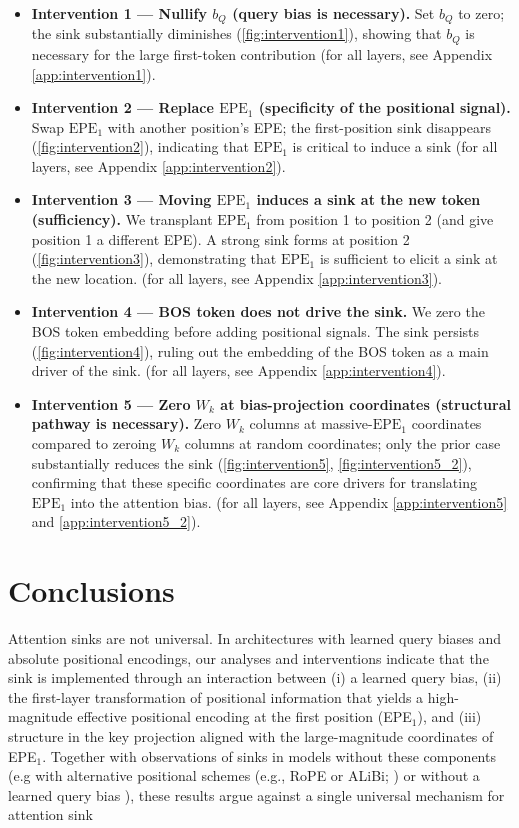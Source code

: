 \documentclass[11pt]{article}
\newif\ifYRMcomments
\newcommand{\YRM}[1]{\ifYRMcomments\textcolor{red}{[YRM: #1]}\fi}
\begin{document}
\begin{itemize}[leftmargin=*]
  \item \textbf{Intervention 1 — Nullify $b_Q$ (query bias is necessary).} Set $b_Q$ to zero; the sink substantially diminishes (\cref{fig:intervention1}), showing that $b_Q$ is necessary for the large first-token contribution (for all layers, see Appendix \ref{app:intervention1}).
  \item \textbf{Intervention 2 — Replace $\mathrm{EPE}_1$ (specificity of the positional signal).} Swap $\mathrm{EPE}_1$ with another position’s EPE; the first-position sink disappears (\cref{fig:intervention2}), indicating that $\mathrm{EPE}_1$ is critical to induce a sink (for all layers, see Appendix \ref{app:intervention2}).
  \item \textbf{Intervention 3 — Moving $\mathrm{EPE}_1$ induces a sink at the new token (sufficiency).} We transplant $\mathrm{EPE}_1$ from position 1 to position 2 (and give position 1 a different EPE). A strong sink forms at position 2 (\cref{fig:intervention3}), demonstrating that $\mathrm{EPE}_1$ is sufficient to elicit a sink at the new location. (for all layers, see Appendix \ref{app:intervention3}).
  \item \textbf{Intervention 4 — BOS token does not drive the sink.} We zero the BOS token embedding before adding positional signals. The sink persists (\cref{fig:intervention4}), ruling out the embedding of the BOS token as a main driver of the sink. (for all layers, see Appendix \ref{app:intervention4}).
  \item \textbf{Intervention 5 — Zero $W_k$ at bias-projection coordinates (structural pathway is necessary).} Zero $W_k$ columns at massive-$\mathrm{EPE}_1$ coordinates compared to zeroing $W_k$ columns at random coordinates; only the prior case substantially reduces the sink (\cref{fig:intervention5}, \cref{fig:intervention5_2}), confirming that these specific coordinates are core drivers for translating $\mathrm{EPE}_1$ into the attention bias. (for all layers, see Appendix \ref{app:intervention5} and \ref{app:intervention5_2}).
\end{itemize}

\section{Conclusions}
Attention sinks are not universal. In architectures with learned query biases and absolute positional encodings, our analyses and interventions indicate that the sink is implemented through an interaction between (i) a learned query bias, (ii) the first-layer transformation of positional information that yields a high-magnitude effective positional encoding at the first position (EPE$_1$), and (iii) structure in the key projection aligned with the large-magnitude coordinates of EPE$_1$. Together with observations of sinks in models without these components (e.g with alternative positional schemes (e.g., RoPE or ALiBi; \YRM{cite}) or without a learned query bias \YRM{cite}), these results argue against a single universal mechanism for attention sink
\end{document}
